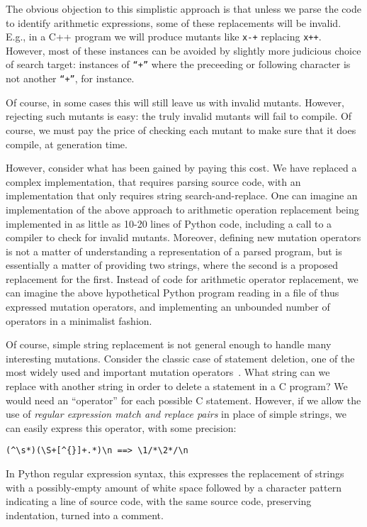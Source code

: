 \documentclass[sigconf,review, anonymous]{acmart}
\begin{document}
The obvious objection to this simplistic approach is that unless we
parse the code to identify arithmetic expressions, some of these
replacements will be invalid.  E.g., in a C++ program we will produce
mutants like {\tt x-+} replacing {\tt x++}.  However, most of these
instances can be avoided by slightly more judicious choice of search
target: instances of {\tt ``+''} where the preceeding or following
character is not another {\tt ``+''}, for instance.

Of course, in some cases this will still leave us with invalid
mutants.  However, rejecting such mutants is easy: the truly invalid
mutants will fail to compile.  Of course, we must pay the price of
checking each mutant to make sure that it does compile, at generation
time.

However, consider what has been gained by paying this cost.  We have
replaced a complex implementation, that requires parsing source code,
with an implementation that only requires string search-and-replace.
One can imagine an implementation of the above approach to arithmetic
operation replacement being implemented in as little as 10-20 lines of
Python code, including a call to a compiler to check for invalid
mutants.  Moreover, defining new mutation operators is not a matter of
understanding a representation of a parsed program, but is essentially
a matter of providing two strings, where the second is a proposed
replacement for the first.  Instead of code for arithmetic operator
replacement, we can imagine the above hypothetical Python program
reading in a file of thus expressed mutation operators, and
implementing an unbounded number of operators in a minimalist fashion.

Of course, simple string replacement is not general enough to handle
many interesting mutations.  Consider the classic case of statement
deletion, one of the most widely used and important mutation
operators~\cite{deng2013empirical}.  What string can we replace with another string in order to
delete a statement in a C program?  We would need an ``operator'' for
each possible C statement.  However, if we allow the use of
\emph{regular expression match and replace pairs} in place of simple
strings, we can easily express this operator, with some precision:

\begin{verbatim}
(^\s*)(\S+[^{}]+.*)\n ==> \1/*\2*/\n
\end{verbatim}

In Python regular expression syntax, this expresses the replacement of
strings with a possibly-empty amount of white space followed by a
character pattern indicating a line of source code, with the same
source code, preserving indentation, turned into a comment.
\end{document}
